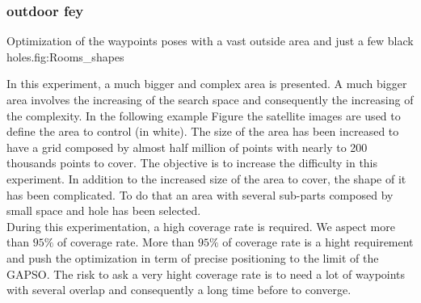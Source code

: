 		\subsubsection{outdoor fey}\label{sec:fey_map}

\begin{mfigures}[!]{ Optimization of the waypoints poses with a vast outside area and just a few  black holes.}{fig:Rooms_shapes} \centering
{}
\hspace{1cm}
\hspace{1cm}
\tabsimuposeFley
\end{mfigures}


In this experiment, a much bigger and complex area is presented.
		A much bigger area involves the increasing of the search space and consequently the increasing of the complexity. 
In the following example Figure  the satellite images are used to define the area to control (in white). The size of the area has been increased to have a grid composed by almost half million of points with nearly to 200 thousands points to cover. 
The objective is to increase the difficulty in this experiment. In addition to the increased size of the area to cover, the shape of it has been complicated. To do that an area with several sub-parts composed by small space and hole has been selected.\\
During this experimentation, a high coverage rate is required. We aspect more than $95\%$ of coverage rate. More than $95\%$ of coverage rate is a hight requirement and push the optimization in term of precise positioning to the limit of the GAPSO. The risk to ask a very hight coverage rate is to need a lot of waypoints with several overlap and consequently a long time before to converge. 

